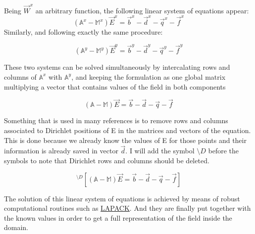 Being $\vec{W}^x$ an arbitrary function, the following linear system of equations appear:
\begin{equation}
\left(\mathbb{A}^x-\mathbb{M}^x\right)\vec{E}^x = \vec{b}^x-\vec{d}^x-\vec{q}^x-\vec{f}^x \label{eq:harmonic_eq_sys_x}
\end{equation}
Similarly, and following exactly the same procedure:

\begin{equation}
\left(\mathbb{A}^y-\mathbb{M}^y\right)\vec{E}^y = \vec{b}^y-\vec{d}^y-\vec{q}^y-\vec{f}^y \label{eq:harmonic_eq_sys_y}
\end{equation}


These two systems can be solved simultaneously by intercalating rows and columns of $\mathbb{A}^x$ with $\mathbb{A}^y$, and keeping the formulation as one global matrix multiplying a vector that contains values of the field in both components


\begin{equation*}
\left(\mathbb{A}-\mathbb{M}\right)\vec{E} = \vec{b}-\vec{d}-\vec{q}-\vec{f}
\end{equation*}

Something that is used in many references is to remove rows and columns associated to Dirichlet positions of E in the matrices and vectors of the equation. This is done because we already know the values of E for those points and their information is already saved in vector $\vec{d}$. I will add the symbol $\setminus D$ before the symbols to note that Dirichlet rows and columns should be deleted.

\begin{equation*}
^{\setminus D}\left[\left(\mathbb{A}-\mathbb{M}\right)\vec{E}= \vec{b}-\vec{d}-\vec{q}-\vec{f}\right]
\end{equation*}

The solution of this linear system of equations is achieved by means of robust computational routines such as \href{http://www.netlib.org/lapack/}{LAPACK}. And they are finally put together with the known values in order to get a full representation of the field inside the domain.

